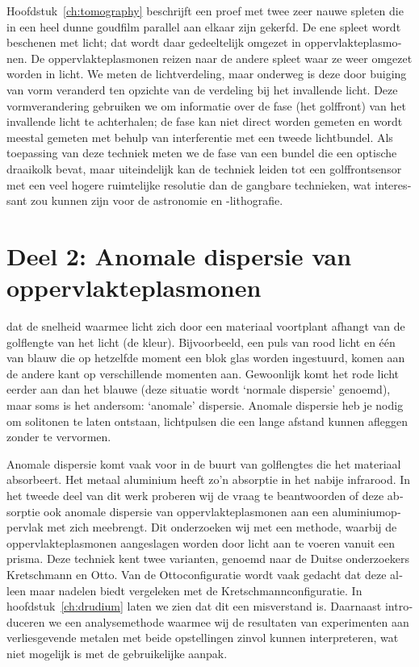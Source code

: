 \begin{otherlanguage}{dutch}
Hoofdstuk~\ref{ch:tomography} beschrijft een proef met twee zeer nauwe spleten die in een heel dunne goudfilm parallel aan elkaar zijn gekerfd.
De ene spleet wordt beschenen met licht; dat wordt daar gedeeltelijk omgezet in oppervlakteplasmonen.
De oppervlakteplasmonen reizen naar de andere spleet waar ze weer omgezet worden in licht.
We meten de lichtverdeling, maar onderweg is deze door buiging van vorm veranderd ten opzichte van de verdeling bij het invallende licht.
Deze vormverandering gebruiken we om informatie over de fase (het golffront) van het invallende licht te achterhalen; de fase kan niet direct worden gemeten en wordt meestal gemeten met behulp van interferentie met een tweede lichtbundel.
Als toepassing van deze techniek meten we de fase van een bundel die een optische draaikolk bevat, maar uiteindelijk kan de techniek leiden tot een golffrontsensor met een veel hogere ruimtelijke resolutie dan de gangbare technieken, wat interessant zou kunnen zijn voor de astronomie en -lithografie.

\section*{Deel 2: Anomale dispersie van oppervlakteplasmonen}

 dat de snelheid waarmee licht zich door een materiaal voortplant afhangt van de golflengte van het licht (de kleur).
Bijvoorbeeld, een puls van rood licht en \'e\'en van blauw die op hetzelfde moment een blok glas worden ingestuurd, komen aan de andere kant op verschillende momenten aan.
Gewoonlijk komt het rode licht eerder aan dan het blauwe (deze situatie wordt `normale dispersie' genoemd), maar soms is het andersom: `anomale' dispersie.
Anomale dispersie heb je nodig om solitonen te laten ontstaan, lichtpulsen die een lange afstand kunnen afleggen zonder te vervormen.

Anomale dispersie komt vaak voor in de buurt van golflengtes die het materiaal absorbeert.
Het metaal aluminium heeft zo’n absorptie in het nabije infrarood.
In het tweede deel van dit werk proberen wij de vraag te beantwoorden of deze absorptie ook anomale dispersie van oppervlakteplasmonen aan een aluminiumoppervlak met zich meebrengt.
Dit onderzoeken wij met een methode, waarbij de oppervlakteplasmonen aangeslagen worden door licht aan te voeren vanuit een prisma.
Deze techniek kent twee varianten, genoemd naar de Duitse onderzoekers Kretschmann en Otto.
Van de Ottoconfiguratie wordt vaak gedacht dat deze alleen maar nadelen biedt vergeleken met de Kretschmannconfiguratie.
In hoofdstuk~\ref{ch:drudium} laten we zien dat dit een misverstand is.
Daarnaast introduceren we een analysemethode waarmee wij de resultaten van experimenten aan verliesgevende metalen met beide opstellingen zinvol kunnen interpreteren, wat niet mogelijk is met de gebruikelijke aanpak.


\end{otherlanguage}
